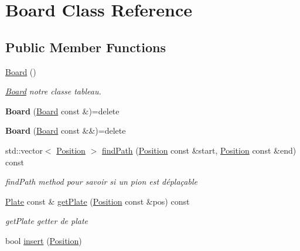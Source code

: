 \hypertarget{class_board}{}\section{Board Class Reference}
\label{class_board}
\subsection*{Public Member Functions}
\begin{DoxyCompactItemize}
\item 
\mbox{\label{class_board_a9ee491d4fea680cf69b033374a9fdfcb}} 
\mbox{\hyperlink{class_board_a9ee491d4fea680cf69b033374a9fdfcb}{Board}} ()
\begin{DoxyCompactList}\small\item\em \mbox{\hyperlink{class_board}{Board}} notre classe tableau. \end{DoxyCompactList}\item 
\mbox{\label{class_board_af5b128c8f9a5005657652650103833ac}} 
{\bfseries Board} (\mbox{\hyperlink{class_board}{Board}} const \&)=delete
\item 
\mbox{\label{class_board_a1d8892353c20a39369feb075406a71af}} 
{\bfseries Board} (\mbox{\hyperlink{class_board}{Board}} const \&\&)=delete
\item 
std\+::vector$<$ \mbox{\hyperlink{class_position}{Position}} $>$ \mbox{\hyperlink{class_board_a3945b0c050763ec67df84b980b2f3aee}{find\+Path}} (\mbox{\hyperlink{class_position}{Position}} const \&start, \mbox{\hyperlink{class_position}{Position}} const \&end) const
\begin{DoxyCompactList}\small\item\em find\+Path method pour savoir si un pion est déplaçable \end{DoxyCompactList}\item 
\mbox{\hyperlink{class_plate}{Plate}} const  \& \mbox{\hyperlink{class_board_ada3e38ef2a96cb211f6ea1832ae50667}{get\+Plate}} (\mbox{\hyperlink{class_position}{Position}} const \&pos) const
\begin{DoxyCompactList}\small\item\em get\+Plate getter de plate \end{DoxyCompactList}\item 
bool \mbox{\hyperlink{class_board_ae0aca00591bd61f362c48b00a3caf80e}{insert}} (\mbox{\hyperlink{class_position}{Position}})

\end{DoxyCompactItemize}
